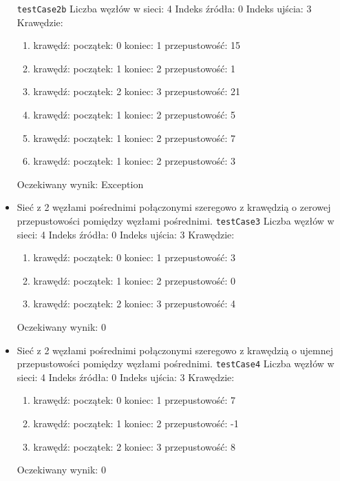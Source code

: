 \begin{itemize}[nosep]
    \texttt{testCase2b}
    Liczba węzłów w sieci: 4
    Indeks źródła: 0
    Indeks ujścia: 3
    Krawędzie:
    \begin{enumerate}[nosep]
        \item krawędź:
        początek: 0
        koniec: 1
        przepustowość: 15
        \item krawędź:
        początek: 1
        koniec: 2
        przepustowość: 1
        \item krawędź:
        początek: 2
        koniec: 3
        przepustowość: 21
        \item krawędź:
        początek: 1
        koniec: 2
        przepustowość: 5
        \item krawędź:
        początek: 1
        koniec: 2
        przepustowość: 7
        \item krawędź:
        początek: 1
        koniec: 2
        przepustowość: 3
    \end{enumerate}
    Oczekiwany wynik: Exception

    \item Sieć z 2 węzłami pośrednimi połączonymi szeregowo z krawędzią o
    zerowej przepustowości pomiędzy węzłami pośrednimi.
    \texttt{testCase3}
    Liczba węzłów w sieci: 4
    Indeks źródła: 0
    Indeks ujścia: 3
    Krawędzie:
    \begin{enumerate}[nosep]
        \item krawędź:
        początek: 0
        koniec: 1
        przepustowość: 3
        \item krawędź:
        początek: 1
        koniec: 2
        przepustowość: 0
        \item krawędź:
        początek: 2
        koniec: 3
        przepustowość: 4
    \end{enumerate}
    Oczekiwany wynik: 0

    \item Sieć z 2 węzłami pośrednimi połączonymi szeregowo z krawędzią o
    ujemnej przepustowości pomiędzy węzłami pośrednimi.
    \texttt{testCase4}
    Liczba węzłów w sieci: 4
    Indeks źródła: 0
    Indeks ujścia: 3
    Krawędzie:
    \begin{enumerate}[nosep]
        \item krawędź:
        początek: 0
        koniec: 1
        przepustowość: 7
        \item krawędź:
        początek: 1
        koniec: 2
        przepustowość: -1
        \item krawędź:
        początek: 2
        koniec: 3
        przepustowość: 8
    \end{enumerate}
    Oczekiwany wynik: 0


\end{itemize}
